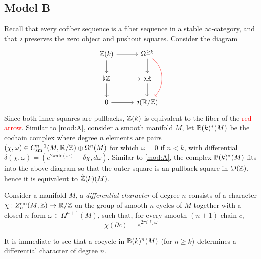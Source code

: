 \documentclass[10pt]{amsart}
\begin{document}
\subsection{Model B}\label{mod:B} Recall that every cofiber sequence is a fiber sequence in a stable $\infty$-category, and that $\flat$ preserves the zero object and pushout squares. Consider the diagram
\[
  \begin{tikzcd}
    {\bZ}(k)\arrow[r]\arrow[d] & \Omega^{\geq k}\arrow[d]\arrow[dd,bend left=5em,color=red] \\
    \flat\bZ \arrow[r]\arrow[d] & \flat\bR\arrow[d] \\
    0\arrow[r] & \flat(\bR/\bZ)
  \end{tikzcd}
\]
Since both inner squares are pullbacks, ${\mathbb{Z}}(k)$ is equivalent to the fiber of the \textcolor{red}{red arrow}. Similar to \cref{mod:A}, consider a smooth manifold $M$, let $\mathbb{B}(k)^*(M)$ be the cochain complex where degree $n$ elements are pairs $(\chi,\omega)\in C_{\mathrm{sm}}^{n-1}(M,\mathbb{R}/\mathbb{Z})\oplus\Omega^n(M)$ for which $\omega=0$ if $n<k$, with differential $\delta(\chi,\omega)=(e^{2\pi i\mathrm{dr}(\omega)}-\delta\chi,d\omega)$. Similar to \cref{mod:A}, the complex $\mathbb{B}(k)^*(M)$ fits into the above diagram so that the outer square is an pullback square in $\mathcal{D}(\mathbb{Z})$, hence it is equivalent to $\hat{\mathbb{Z}}(k)(M)$.
\begin{definition} Consider a manifold $M$, a \emph{differential character} of degree $n$ consists of a character $\chi:Z^{\mathrm{sm}}_{n}(M,\mathbb{Z})\to\mathbb{R}/\mathbb{Z}$ on the group of smooth $n$-cycles of $M$ together with a closed $n$-form $\omega\in\Omega^{n+1}(M)$, such that, for every smooth $(n+1)$-chain $c$, \[\chi(\partial c)=e^{2\pi i\int_c\omega}\]
\end{definition}
It is immediate to see that a cocycle in $\mathbb{B}(k)^n(M)$ (for $n\geq k$) determines a differential character of degree $n$. 
\end{document}
